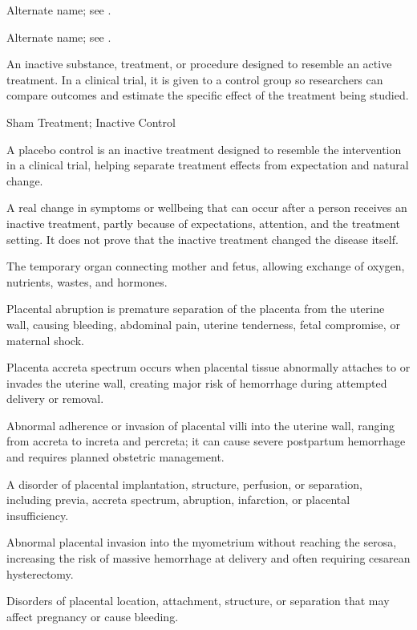  Alternate name; see .

 Alternate name; see .

 An inactive substance, treatment, or procedure designed to resemble an active treatment. In a clinical trial, it is given to a control group so researchers can compare outcomes and estimate the specific effect of the treatment being studied.

\synonyms
Sham Treatment; Inactive Control

 A placebo control is an inactive treatment designed to resemble the intervention in a clinical trial, helping separate treatment effects from expectation and natural change.

 A real change in symptoms or wellbeing that can occur after a person receives an inactive treatment, partly because of expectations, attention, and the treatment setting. It does not prove that the inactive treatment changed the disease itself.

 The temporary organ connecting mother and fetus, allowing exchange of oxygen, nutrients, wastes, and hormones.

 Placental abruption is premature separation of the placenta from the uterine wall, causing bleeding, abdominal pain, uterine tenderness, fetal compromise, or maternal shock.

 Placenta accreta spectrum occurs when placental tissue abnormally attaches to or invades the uterine wall, creating major risk of hemorrhage during attempted delivery or removal.

 Abnormal adherence or invasion of placental villi into the uterine wall, ranging from accreta to increta and percreta; it can cause severe postpartum hemorrhage and requires planned obstetric management.

 A disorder of placental implantation, structure, perfusion, or separation, including previa, accreta spectrum, abruption, infarction, or placental insufficiency.

 Abnormal placental invasion into the myometrium without reaching the serosa, increasing
the risk of massive hemorrhage at delivery and often requiring cesarean hysterectomy.

 Disorders of placental location, attachment, structure, or separation that may affect pregnancy or cause bleeding.

